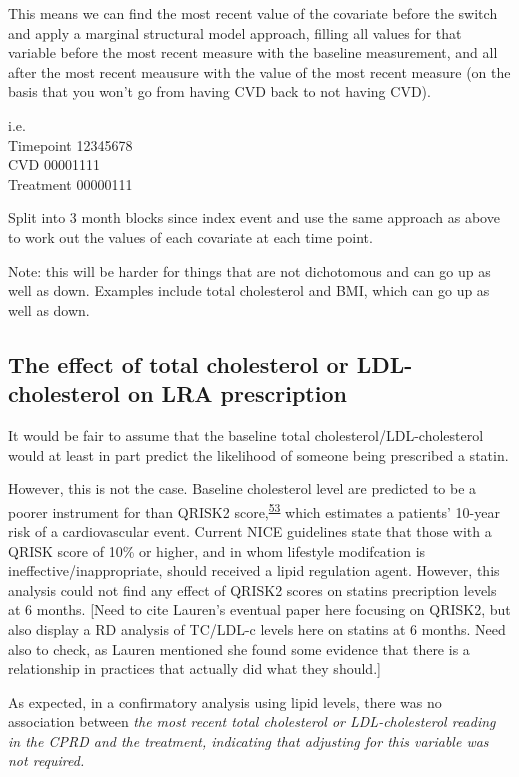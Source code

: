 \documentclass[a4paper, twoside]{templates/ociamthesis}
\begin{document}
This means we can find the most recent value of the covariate before the switch and apply a marginal structural model approach, filling all values for that variable before the most recent measure with the baseline measurement, and all after the most recent meausure with the value of the most recent measure (on the basis that you won't go from having CVD back to not having CVD).

i.e.\\
Timepoint 12345678\\
CVD 00001111\\
Treatment 00000111

Split into 3 month blocks since index event and use the same approach as above to work out the values of each covariate at each time point.

Note: this will be harder for things that are not dichotomous and can go up as well as down. Examples include total cholesterol and BMI, which can go up as well as down.

\hypertarget{the-effect-of-total-cholesterol-or-ldl-cholesterol-on-lra-prescription}{%
\subsection{The effect of total cholesterol or LDL-cholesterol on LRA prescription}\label{the-effect-of-total-cholesterol-or-ldl-cholesterol-on-lra-prescription}}

It would be fair to assume that the baseline total cholesterol/LDL-cholesterol would at least in part predict the likelihood of someone being prescribed a statin.

However, this is not the case. Baseline cholesterol level are predicted to be a poorer instrument for than QRISK2 score,\textsuperscript{\protect\hyperlink{ref-hippisley-cox2008}{53}} which estimates a patients' 10-year risk of a cardiovascular event. Current NICE guidelines state that those with a QRISK score of 10\% or higher, and in whom lifestyle modifcation is ineffective/inappropriate, should received a lipid regulation agent. However, this analysis could not find any effect of QRISK2 scores on statins precription levels at 6 months. {[}Need to cite Lauren's eventual paper here focusing on QRISK2, but also display a RD analysis of TC/LDL-c levels here on statins at 6 months. Need also to check, as Lauren mentioned she found some evidence that there is a relationship in practices that actually did what they should.{]}

As expected, in a confirmatory analysis using lipid levels, there was no association between \emph{the most recent total cholesterol or LDL-cholesterol reading in the CPRD and the treatment, indicating that adjusting for this variable was not required.}
\end{document}
